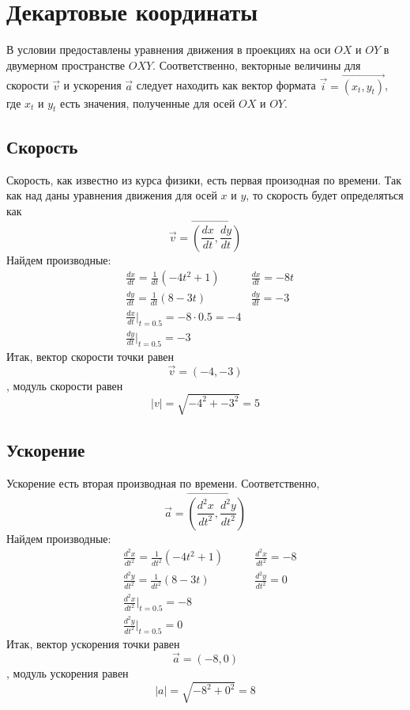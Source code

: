 \section{Декартовые координаты}
В условии предоставлены уравнения движения в проекциях на оси $OX$ и $OY$
в двумерном пространстве $OXY$. Соответственно, векторные величины для
скорости $\vec{v}$ и ускорения $\vec{a}$ следует находить как вектор
формата $\vec{i}=\vec{(x_{t}, y_{t})}$, где $x_{t}$ и $y_{t}$ есть значения,
полученные для осей $OX$ и $OY$.

\subsection{Скорость}
Скорость, как известно из курса физики, есть первая произодная по времени.
Так как над даны уравнения движения для осей $x$ и $y$, то скорость будет
определяться как $$ \vec{v} = \vec{(\frac{dx}{dt}, \frac{dy}{dt})} $$
Найдем производные:
\begin{align}
    &\frac{dx}{dt} = \frac{1}{dt}(-4t^{2} + 1) \qquad
    &\frac{dx}{dt} = -8t \\
    &\frac{dy}{dt} = \frac{1}{dt}(8 - 3t) \qquad
    &\frac{dy}{dt} = -3 \\
    &\frac{dx}{dt} \bigg|_{t=0.5} = -8 \cdot 0.5 = -4 \\
    &\frac{dy}{dt} \bigg|_{t=0.5} = -3
\end{align}
Итак, вектор скорости точки равен $$ \vec{v} = ( -4, -3 ) $$,
модуль скорости равен $$ \left|{v}\right| = \sqrt{-4^{2} + -3^{2}} = 5 $$

\subsection{Ускорение}
Ускорение есть вторая производная по времени. Соответственно,
$$ \vec{a} = \vec{(\frac{d^{2}x}{dt^{2}}, \frac{d^{2}y}{dt^{2}})} $$
Найдем производные:
\begin{align}
    &\frac{d^{2}x}{dt^{2}} = \frac{1}{dt^{2}}(-4t^{2} + 1) \qquad
    &\frac{d^{2}x}{dt^{2}} = -8 \\
    &\frac{d^{2}y}{dt^{2}} = \frac{1}{dt^{2}}(8 - 3t) \qquad
    &\frac{d^{2}y}{dt^{2}} = 0 \\
    &\frac{d^{2}x}{dt^{2}} \bigg|_{t=0.5} = -8 \\
    &\frac{d^{2}y}{dt^{2}} \bigg|_{t=0.5} = 0
\end{align}
Итак, вектор ускорения точки равен $$ \vec{a} = ( -8, 0 ) $$,
модуль ускорения равен $$ \left|{a}\right| = \sqrt{-8^{2} + 0^{2}} = 8 $$

